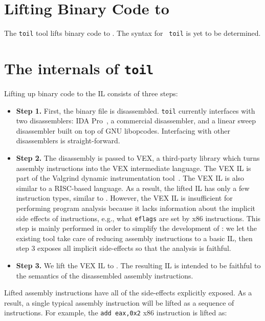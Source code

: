 \section{Lifting Binary Code to \bil}

The {\tt toil} tool lifts binary code to \bil.  The syntax for {\tt
  toil} is yet to be determined.


\section{The internals of {\tt toil}}
Lifting up binary code to the IL consists of three steps:
\begin{itemize}\squish
\item {\bf Step 1.} First, the binary file is disassembled. {\tt toil}
  currently interfaces with two disassemblers: IDA Pro~\cite{idapro},
  a commercial disassembler, and a linear sweep disassembler built on
  top of GNU libopcodes.  Interfacing with other disassemblers is
  straight-forward.

\item {\bf Step 2.} The disassembly is passed to VEX, a third-party
  library which turns assembly instructions into the VEX intermediate
  language. The VEX IL is part of the Valgrind dynamic instrumentation
  tool~\cite{nethercote:2004:phd}.  The VEX IL is also similar to a
  RISC-based language. As a result, the lifted IL has only a few
  instruction types, similar to \bap. However, the VEX IL  is
  insufficient for performing program analysis because it lacks
  information about the implicit side effects of instructions, e.g., what
  {\tt eflags} are set by x86 instructions.  This step is mainly
  performed in order to simplify the development of \bap: we let the
  existing tool take care of reducing assembly instructions to a
  basic IL, then step 3 exposes all implicit side-effects so that
  the analysis is faithful.

  

\item {\bf Step 3.} We lift the VEX IL to \bil.  The resulting \bil
  IL is intended to be faithful to the semantics of the disassembled
  assembly instructions. 
\end{itemize}

Lifted assembly instructions have all of the side-effects explicitly
exposed.  As a result, a single typical assembly instruction will be
lifted as a sequence of \bil instructions.  For example, the {\tt add
  eax,0x2} x86 instruction is lifted as:

